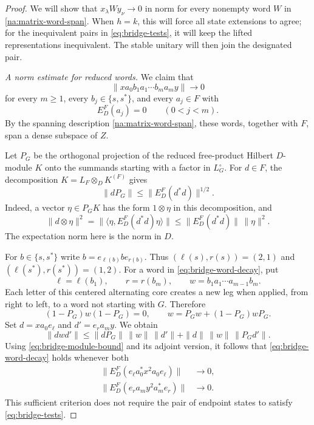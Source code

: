 \begin{proof}
We will show that $x_\lambda W y_\nu\to0$ in norm for every
nonempty word $W$ in \eqref{na:matrix-word-span}.
When $h=k$, this will force all state extensions to agree; for the
inequivalent pairs in \eqref{eq:bridge-tests}, it will keep the lifted
representations inequivalent. The stable unitary will then join the
designated pair.

\medskip\noindent
\emph{A norm estimate for reduced words.}
We claim that
\begin{equation}\label{eq:bridge-word-decay}
 \|x a_0b_1a_1\cdots b_m a_m y\|\longrightarrow0
\end{equation}
for every $m\geq1$, every $b_j\in\{s,s^*\}$, and every $a_j\in F$
with
\begin{equation}\label{eq:bridge-centering}
 E_D^F(a_j)=0\qquad(0<j<m).
\end{equation}
By the spanning description \eqref{na:matrix-word-span}, these words,
together with $F$, span a dense subspace of $Z$.

Let $P_G$ be the orthogonal projection of the reduced free-product
Hilbert $D$-module $K$ onto the summands starting with a factor in
$L_G^\circ$. For $d\in F$, the decomposition
$K=L_F\otimes_D K^{(F)}$ gives
\begin{equation}\label{eq:bridge-module-bound}
 \|dP_G\|\leq\|E_D^F(d^*d)\|^{1/2}.
\end{equation}
Indeed, a vector $\eta\in P_GK$ has the form $1\otimes\eta$
in this decomposition, and
\[
 \|d\otimes\eta\|^2
 =\|\langle\eta,E_D^F(d^*d)\eta\rangle\|
 \leq\|E_D^F(d^*d)\|\,\|\eta\|^2.
\]
The expectation norm here is the norm in $D$.

For $b\in\{s,s^*\}$ write $b=e_{\ell(b)}be_{r(b)}$.
Thus $(\ell(s),r(s))=(2,1)$ and
$(\ell(s^*),r(s^*))=(1,2)$. For a word in
\eqref{eq:bridge-word-decay}, put
\[
 \ell=\ell(b_1),\qquad r=r(b_m),\qquad
 w=b_1a_1\cdots a_{m-1}b_m.
\]
Each letter of this centered alternating core creates a new leg when
applied, from right to left, to a word not starting with $G$. Therefore
\[
 (1-P_G)w(1-P_G)=0,
 \qquad w=P_Gw+(1-P_G)wP_G.
\]
Set $d=xa_0e_\ell$ and $d'=e_ra_my$. We obtain
\begin{equation}\label{eq:bridge-two-ends}
 \|dwd'\|
 \leq \|dP_G\|\,\|w\|\,\|d'\|
       +\|d\|\,\|w\|\,\|P_Gd'\|.
\end{equation}
Using \eqref{eq:bridge-module-bound} and its adjoint version, it follows
that \eqref{eq:bridge-word-decay} holds whenever both
\begin{equation}\label{eq:bridge-endpoints}
 \begin{split}
 \|E_D^F(e_\ell a_0^*x^2a_0e_\ell)\|&\longrightarrow0,\\
 \|E_D^F(e_r a_my^2a_m^*e_r)\|&\longrightarrow0.
 \end{split}
\end{equation}
This sufficient criterion does not require the pair of endpoint
states to satisfy \eqref{eq:bridge-tests}.


\end{proof}
